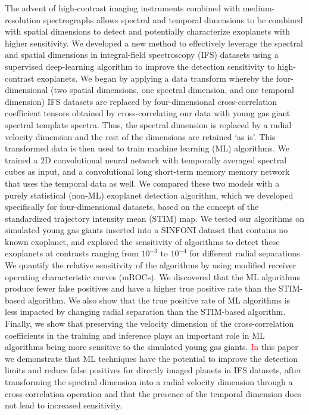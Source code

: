 \documentclass{aa}
\newcommand{\newchange}[1]{\textcolor{black}{#1}}
\begin{document}
  \abstract
{The advent of high-contrast imaging instruments combined with medium-resolution spectrographs allows spectral and temporal dimensions to be combined with spatial dimensions to detect and potentially characterize exoplanets with higher sensitivity.}
  {We developed a new method to effectively leverage the spectral and spatial dimensions in integral-field spectroscopy (IFS) datasets using a supervised deep-learning algorithm to improve the detection sensitivity to high-contrast exoplanets.}
  {We began by applying a data transform whereby the four-dimensional (two spatial dimensions, one spectral dimension, and one temporal dimension) IFS datasets are replaced by four-dimensional cross-correlation coefficient tensors obtained by cross-correlating our data with \newchange{young gas giant} spectral template spectra.
  Thus, the spectral dimension is replaced by a radial velocity dimension and the rest of the dimensions are retained `as is'.
  This transformed data is then used to train machine learning (ML) algorithms.
  We trained a 2D convolutional neural network 
  with temporally averaged spectral cubes as input, and a convolutional long short-term memory memory network that uses the temporal data as well.
   We compared these two models with a purely statistical (non-ML) exoplanet detection algorithm, which we developed specifically for four-dimensional datasets, based on the concept of the standardized trajectory intensity mean (STIM) map. %
  We tested our algorithms on simulated \newchange{young gas giant}s inserted into a SINFONI dataset that contains no known exoplanet, and explored the sensitivity of algorithms to detect these exoplanets at contrasts ranging from $10^{-3}$ to $10^{-4}$ for different radial separations.
  }
  {We quantify the relative sensitivity of the algorithms by using modified receiver operating characteristic curves (mROCs).
  We discovered that the ML algorithms produce fewer false positives and have a higher true positive rate than the STIM-based algorithm.
  We also show that the true positive rate of ML algorithms is less impacted by changing radial separation than the STIM-based algorithm.
  Finally, we show that preserving the velocity dimension of the cross-correlation coefficients in the training and inference plays an important role in ML algorithms being more sensitive to the simulated \newchange{young gas giant}s.}
  {\textcolor{red}{In} this paper we demonstrate that ML techniques have the potential to improve the detection limits and reduce false positives for directly imaged planets in IFS datasets, after transforming the spectral dimension into a radial velocity dimension through a cross-correlation operation and that the presence of the temporal dimension does not lead to increased sensitivity.
  }
\end{document}
